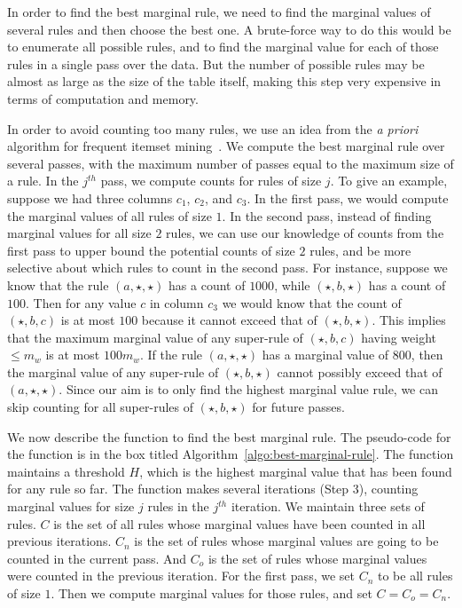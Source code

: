  In order to find the best marginal rule, we need to find the marginal values of several rules and then choose the best one. A brute-force way to do this would be to enumerate all possible rules, and to find the marginal value for each of those rules in a single pass over the data. But the number of possible rules may be almost as large as the size of the table itself, making this step very expensive in terms of computation and memory. 

In order to avoid counting too many rules, we use an idea from the {\em a priori} algorithm for frequent itemset mining~\cite{apriori}. We compute the best marginal rule over several passes, with the maximum number of passes equal to the maximum size of a rule. In the $j^{th}$ pass, we compute counts for rules of size $j$. To give an example, suppose we had three columns $c_1$, $c_2$, and $c_3$. In the first pass, we would compute the marginal values of all rules of size $1$. In the second pass, instead of finding marginal values for all size $2$ rules, we can use our knowledge of counts from the first pass to upper bound the potential counts of size $2$ rules, and be more selective about which rules to count in the second pass. For instance, suppose we know that the rule $(a, \star, \star)$ has a count of $1000$, while $(\star, b, \star)$ has a count of $100$. Then for any value $c$ in column $c_3$ we would know that the count of $(\star, b, c)$ is at most $100$ because it cannot exceed that of $(\star, b, \star)$. This implies that the maximum marginal value of any super-rule of $(\star, b, c)$ having weight $\leq m_w$ is at most $100m_w$. If the rule $(a, \star, \star)$ has a marginal value of $800$, then the marginal value of any super-rule of $(\star, b, \star)$ cannot possibly exceed that of $(a, \star, \star)$. Since our aim is to only find the highest marginal value rule, we can skip counting for all super-rules of $(\star, b, \star)$ for future passes.

We now describe the function to find the best marginal rule. The pseudo-code for the function is in the box titled Algorithm~\ref{algo:best-marginal-rule}. The function maintains a threshold $H$, which is the highest marginal value that has been found for any rule so far. The function makes several iterations (Step $3$), counting marginal values for size $j$ rules in the $j^{th}$ iteration. We maintain three sets of rules. $C$ is the set of all rules whose marginal values have been counted in all previous iterations. $C_n$ is the set of rules whose marginal values are going to be counted in the current pass. And $C_o$ is the set of rules whose marginal values were counted in the previous iteration. For the first pass, we set $C_n$ to be all rules of size $1$. Then we compute marginal values for those rules, and set $C = C_o = C_n$.

